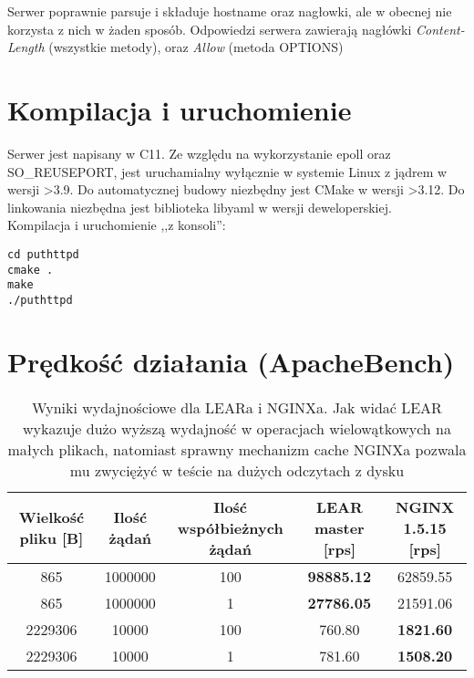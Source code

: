 \documentclass[a4paper]{article}
\begin{document}
Serwer poprawnie parsuje i składuje hostname oraz nagłowki, ale w obecnej nie korzysta z nich w żaden sposób. Odpowiedzi serwera zawierają nagłówki \emph{Content-Length} (wszystkie metody), oraz \emph{Allow} (metoda OPTIONS)

\section{Kompilacja i uruchomienie}
Serwer jest napisany w C11. Ze względu na wykorzystanie epoll oraz SO\_REUSEPORT, jest uruchamialny wyłącznie w systemie Linux z jądrem w wersji >3.9. Do automatycznej budowy niezbędny jest CMake w wersji >3.12. Do linkowania niezbędna jest biblioteka libyaml w wersji deweloperskiej. \\
Kompilacja i uruchomienie ,,z konsoli'':
\begin{verbatim}
cd puthttpd
cmake .
make
./puthttpd
\end{verbatim}

\section{Prędkość działania (ApacheBench)}
\begin{table}[H]
\begin{tabular}{|c|c|c|c|c|}
\hline
Wielkość pliku [B] & Ilość żądań & Ilość współbieżnych żądań & LEAR master [rps] & NGINX 1.5.15 [rps] \\
\hline
865 & 1000000 & 100 & \textbf{98885.12} & 62859.55 \\
\hline
865 & 1000000 & 1 & \textbf{27786.05} & 21591.06 \\
\hline
2229306 & 10000 & 100 & 760.80 & \textbf{1821.60} \\
\hline
2229306 & 10000 & 1 & 781.60 & \textbf{1508.20} \\
\hline
\end{tabular}
\caption{Wyniki wydajnościowe dla LEARa i NGINXa. Jak widać LEAR wykazuje dużo wyższą wydajność w operacjach wielowątkowych na małych plikach, natomiast sprawny mechanizm cache NGINXa pozwala mu zwyciężyć w teście na dużych odczytach z dysku}
\end{table}
\end{document}
